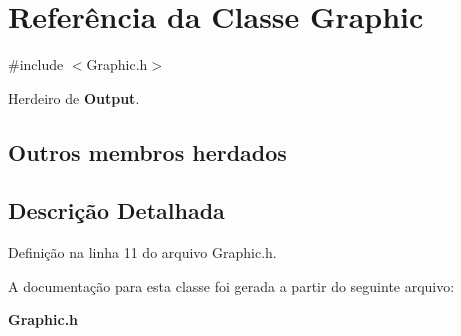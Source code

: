 \section{Referência da Classe Graphic}
\label{class_graphic}


{\ttfamily \#include $<$Graphic.\+h$>$}



Herdeiro de {\bf Output}.

\subsection*{Outros membros herdados}


\subsection{Descrição Detalhada}


Definição na linha 11 do arquivo Graphic.\+h.



A documentação para esta classe foi gerada a partir do seguinte arquivo\+:\begin{DoxyCompactItemize}
\item 
{\bf Graphic.\+h}\end{DoxyCompactItemize}
